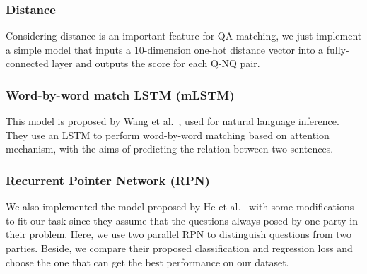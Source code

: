 \subsubsection{Distance}
Considering distance is an important feature for QA matching, we just implement a simple model that inputs a 10-dimension one-hot distance vector into a fully-connected layer and outputs the score for each Q-NQ pair.  


\subsubsection{Word-by-word match LSTM (mLSTM)}
This model is proposed by Wang et al.~, used for natural language inference. They use an LSTM to perform word-by-word matching based on attention mechanism, with the aims of predicting the relation between two sentences.


\subsubsection{Recurrent Pointer Network (RPN)}
We also implemented the model proposed by He et al.~ with some modifications to fit our task since they assume that the questions always posed by one party in their problem. 
Here, we use two parallel RPN to distinguish questions from two parties. Beside, we compare their proposed classification and regression loss and choose the one that can get the best performance on our dataset.

